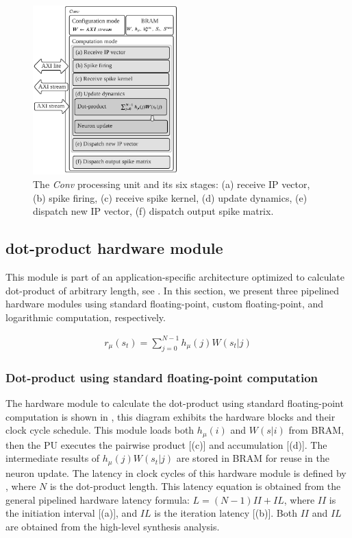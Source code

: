 \begin{figure}
	\centering
	\includegraphics[width=0.5\textwidth]{../figures/sbs_conv.pdf}
	\caption{The \emph{Conv} processing unit and its six stages: (a) receive IP vector, (b) spike firing, (c) receive spike kernel, (d) update dynamics, (e) dispatch new IP vector, (f) dispatch output spike matrix.}
	\label{fig:hw_conv}
\end{figure}

\subsection{dot-product hardware module}
This module is part of an application-specific architecture optimized to calculate dot-product of arbitrary length, see . In this section, we present three pipelined hardware modules using standard floating-point, custom floating-point, and logarithmic computation, respectively.

\begin{eqnarray} \label{eq:dot_product}
r_{\mu}\left(s_t\right)=\sum_{j=0}^{N-1}h_{\mu}(j)W(s_t|j)
\end{eqnarray}



\subsubsection{Dot-product using standard floating-point computation}
 The hardware module to calculate the dot-product using standard floating-point computation is shown in , this diagram exhibits the hardware blocks and their clock cycle schedule. This module loads both $h_\mu(i)$ and $W(s|i)$ from BRAM, then the PU executes the pairwise product [(c)] and accumulation [(d)]. The intermediate results of $h_\mu(j) W(s_t|j)$ are stored in BRAM for reuse in the neuron update. The latency in clock cycles of this hardware module is defined by , where $N$ is the dot-product length. This latency equation is obtained from the general pipelined hardware latency formula: $L=\left(N-1\right)II+IL$, where $II$ is the initiation interval [(a)], and $IL$ is the iteration latency [(b)]. Both $II$ and $IL$ are obtained from the high-level synthesis analysis.
 
